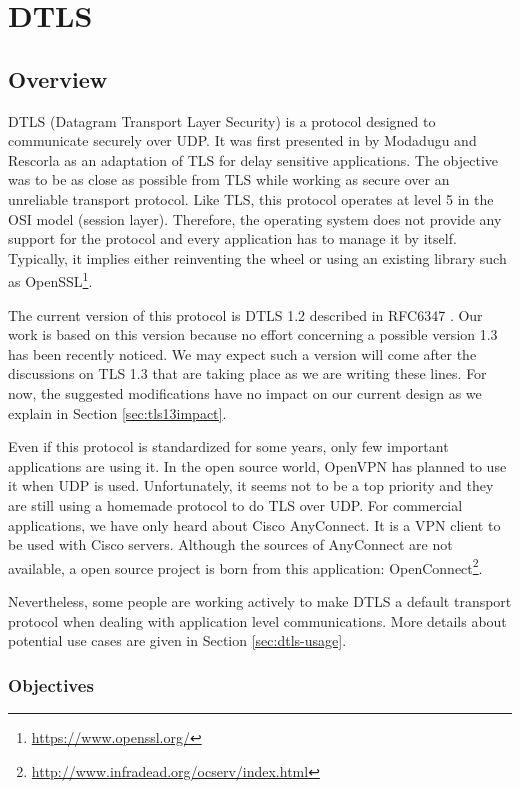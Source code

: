 \chapter{DTLS}\label{chap:dtls}


\section{Overview}

DTLS (Datagram Transport Layer Security) is a protocol designed to communicate securely over UDP. It was first presented in \cite{modadugu2004design} by Modadugu and Rescorla as an adaptation of TLS for delay sensitive applications. The objective was to be as close as possible from TLS while working as secure over an unreliable transport protocol. Like TLS, this protocol operates at level 5 in the OSI model (session layer). Therefore, the operating system does not provide any support for the protocol and every application has to manage it by itself. Typically, it implies either reinventing the wheel or using an existing library such as OpenSSL\footnote{\url{https://www.openssl.org/}}.

The current version of this protocol is DTLS 1.2 described in RFC6347 \cite{rfc6347}. Our work is based on this version because no effort concerning a possible version 1.3 has been recently noticed. We may expect such a version will come after the discussions on TLS 1.3 that are taking place as we are writing these lines. For now, the suggested modifications have no impact on our current design as we explain in Section \ref{sec:tls13impact}.

Even if this protocol is standardized for some years, only few important applications are using it. In the open source world, OpenVPN has planned to use it when UDP is used. Unfortunately, it seems not to be a top priority and they are still using a homemade protocol to do TLS over UDP. For commercial applications, we have only heard about Cisco AnyConnect. It is a VPN client to be used with Cisco servers. Although the sources of AnyConnect are not available, a open source project is born from this application: OpenConnect\footnote{\url{http://www.infradead.org/ocserv/index.html}}.

Nevertheless, some people are working actively to make DTLS a default transport protocol when dealing with application level communications. More details about potential use cases are given in Section \ref{sec:dtls-usage}.

\subsection{Objectives}

